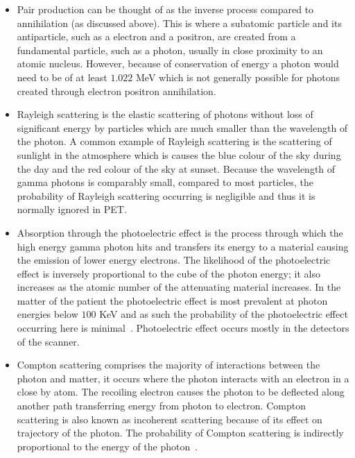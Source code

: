                 \begin{itemize}
                    \item Pair production can be thought of as the inverse process compared to annihilation (as discussed above). This is where a subatomic particle and its antiparticle, such as a electron and a positron, are created from a fundamental particle, such as a photon, usually in close proximity to an atomic nucleus. However, because of conservation of energy a photon would need to be of at least $1.022$ \gls{MeV} which is not generally possible for photons created through electron positron annihilation.
                    
                    \item Rayleigh scattering is the elastic scattering of photons without loss of significant energy by particles which are much smaller than the wavelength of the photon. A common example of Rayleigh scattering is the scattering of sunlight in the atmosphere which is causes the blue colour of the sky during the day and the red colour of the sky at sunset. Because the wavelength of gamma photons is comparably small, compared to most particles, the probability of Rayleigh scattering occurring is negligible and thus it is normally ignored in \gls{PET}.
                    
                    \item Absorption through the photoelectric effect is the process through which the high energy gamma photon hits and transfers its energy to a material causing the emission of lower energy electrons. The likelihood of the photoelectric effect is inversely proportional to the cube of the photon energy; it also increases as the atomic number of the attenuating material increases. In the matter of the patient the photoelectric effect is most prevalent at photon energies below $100$ \gls{KeV} and as such the probability of the photoelectric effect occurring here is minimal~. Photoelectric effect occurs mostly in the detectors of the scanner.
                    
                    \item Compton scattering comprises the majority of interactions between the photon and matter, it occurs where the photon interacts with an electron in a close by atom. The recoiling electron causes the photon to be deflected along another path transferring energy from photon to electron. Compton scattering is also known as incoherent scattering because of its effect on trajectory of the photon. The probability of Compton scattering is indirectly proportional to the energy of the photon~.
                \end{itemize}
                
